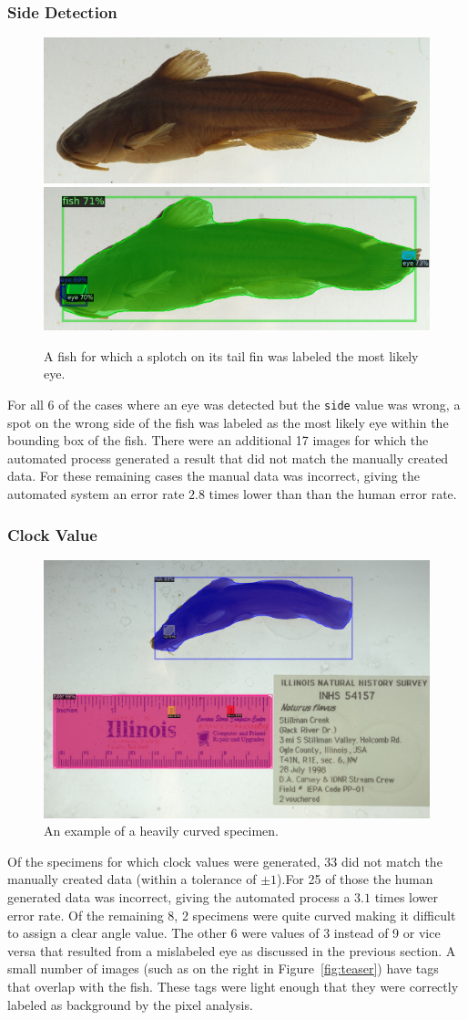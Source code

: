 \documentclass[conference]{IEEEtran}
\begin{document}
\subsubsection{Side Detection}
\begin{figure}[H]
  \centering
  \includegraphics[width=0.49\linewidth]{images/wrong_side_orig}
  \includegraphics[width=0.49\linewidth]{images/wrong_side1}
  \caption{A fish for which a splotch on its tail fin was labeled the most likely eye.}
\end{figure}
For all 6 of the cases where an eye was detected but the \verb|side| value was wrong, a spot on the wrong side of the fish was labeled as the most likely eye within the bounding box of the fish. There were an additional 17 images for which the automated process generated a result that did not match the manually created data. For these remaining cases the manual data was incorrect, giving the automated system an error rate \(2.8\) times lower than than the human error rate.

\subsubsection{Clock Value}
\begin{figure}[H]
  \centering
  \includegraphics[width=0.49\linewidth]{images/curved1}
  \caption{An example of a heavily curved specimen.}
\end{figure}
Of the specimens for which clock values were generated, 33 did not match the manually created data (within a tolerance of \(\pm{}1\)).For 25 of those the human generated data was incorrect, giving the automated process a \(3.1\) times lower error rate. Of the remaining 8, 2 specimens were quite curved making it difficult to assign a clear angle value. The other 6 were values of 3 instead of 9 or vice versa that resulted from a mislabeled eye as discussed in the previous section. A small number of images (such as on the right in Figure~\ref{fig:teaser}) have tags that overlap with the fish. These tags were light enough that they were correctly labeled as background by the pixel analysis.
\end{document}
